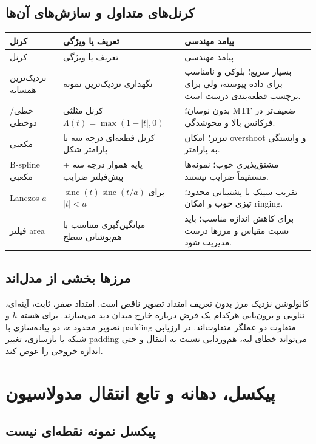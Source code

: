 \documentclass[12pt,openany,oneside]{book}
\newcommand{\sinc}{\operatorname{sinc}}
\begin{document}
\subsection{کرنل‌های متداول و سازش‌های آن‌ها}

\begin{longtable}{p{}p{}p{}}
\toprule
کرنل & تعریف یا ویژگی & پیامد مهندسی\\
\midrule
\endfirsthead
\toprule
کرنل & تعریف یا ویژگی & پیامد مهندسی\\
\midrule
\endhead
نزدیک‌ترین همسایه & نگهداری نزدیک‌ترین نمونه & بسیار سریع؛ بلوکی و نامناسب برای داده پیوسته، ولی برای برچسب قطعه‌بندی درست است.\\
خطی/دوخطی & کرنل مثلثی \(\Lambda(t)=\max(1-|t|,0)\) & بدون نوسان؛ MTF ضعیف‌تر در فرکانس بالا و محوشدگی.\\
مکعبی & کرنل قطعه‌ای درجه سه با پارامتر شکل & تیزتر؛ امکان overshoot و وابستگی به پارامتر.\\
B-spline مکعبی & پایه هموار درجه سه + پیش‌فیلتر ضرایب & مشتق‌پذیری خوب؛ نمونه‌ها مستقیماً ضرایب نیستند.\\
Lanczos-\(a\) & \(\sinc(t)\sinc(t/a)\) برای \(|t|<a\) & تقریب سینک با پشتیبانی محدود؛ تیزی خوب و امکان ringing.\\
فیلتر area & میانگین‌گیری متناسب با هم‌پوشانی سطح & برای کاهش اندازه مناسب؛ باید نسبت مقیاس و مرزها درست مدیریت شود.\\
\bottomrule
\end{longtable}

\subsection{مرزها بخشی از مدل‌اند}

کانولوشن نزدیک مرز بدون تعریف امتداد تصویر ناقص است. امتداد صفر، ثابت، آینه‌ای، تناوبی و
برون‌یابی هرکدام یک فرض درباره خارج میدان دید می‌سازند. برای هسته \(h\) و تصویر محدود \(x\)،
دو پیاده‌سازی با padding متفاوت دو عملگر متفاوت‌اند. در ارزیابی شبکه یا بازسازی، تغییر padding
می‌تواند خطای لبه، هم‌وردایی نسبت به انتقال و حتی اندازه خروجی را عوض کند.

\section{پیکسل، دهانه و تابع انتقال مدولاسیون}

\subsection{پیکسل نمونه نقطه‌ای نیست}
\end{document}
